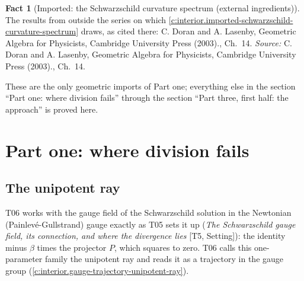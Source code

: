 \documentclass[11pt]{article}
\theoremstyle{definition}
\newtheorem{fact}[theorem]{Fact}
\theoremstyle{plain}
\begin{document}
\begin{fact}[Imported: the Schwarzschild curvature spectrum (external ingredients)]\label{c:interior.imported-schwarzschild-curvature-spectrum-external}
The results from outside the series on which \ref{c:interior.imported-schwarzschild-curvature-spectrum} draws, as cited there: C. Doran and A. Lasenby, Geometric Algebra for Physicists, Cambridge University Press (2003)., Ch.~14.
\emph{Source:} C. Doran and A. Lasenby, Geometric Algebra for Physicists, Cambridge University Press (2003)., Ch.~14.
\end{fact}

\label{c:note.interior.setting-setting-conventions-2}
These are the only geometric imports of Part one; everything else in the section ``Part one: where division fails'' through the section ``Part three, first half: the approach'' is proved here.

\section{Part one: where division fails}

\subsection*{The unipotent ray}
\label{c:note.interior.setting-unipotent-ray}
T06 works with the gauge field of the Schwarzschild solution in the Newtonian (Painlev\'e-Gullstrand) gauge exactly as T05 sets it up (\emph{The Schwarzschild gauge field, its connection, and where the divergence lies} [T5, Setting]): the identity minus $\beta$ times the projector $P$, which squares to zero. T06 calls this one-parameter family the unipotent ray and reads it as a trajectory in the gauge group (\ref{c:interior.gauge-trajectory-unipotent-ray}).
\end{document}

